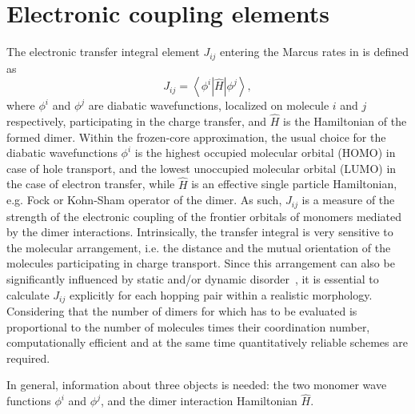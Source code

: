 \section{Electronic coupling elements}
\label{sec:transfer_integrals}

The electronic transfer integral element $J_{ij}$ entering the Marcus rates in  is defined as
\begin{equation}
   J_{ij} = \left\langle \phi^i \left\vert \hat{H} \right\vert \phi^j \right\rangle ,
\label{equ:TI}
\end{equation}
where $\phi^i$ and $\phi^j$ are diabatic wavefunctions, localized on molecule $i$ and $j$ respectively, participating in the charge transfer, and $\hat{H}$ is the Hamiltonian of the formed dimer. Within the frozen-core approximation, the usual choice for the diabatic wavefunctions $\phi^i$  is the highest occupied molecular orbital (HOMO) in case of hole transport, and the lowest unoccupied molecular orbital (LUMO) in the case of electron transfer, while $\hat{H}$ is an effective single particle Hamiltonian, e.g. Fock or Kohn-Sham operator of the dimer. As such, $J_{ij}$ is a measure of the strength of the electronic coupling of the frontier orbitals of monomers mediated by the dimer interactions. Intrinsically, the transfer integral is very sensitive to the molecular arrangement, i.e. the distance and the mutual orientation of the molecules participating in charge transport. Since this arrangement can also be significantly influenced by
static and/or dynamic disorder~\cite{hutchison_hopping_2005,kirkpatrick_columnar_2008,troisi_charge_2009,vehoff_charge_2010-1,vehoff_charge_2010-2},
it is essential to calculate $J_{ij}$ explicitly for each hopping pair within a realistic morphology. Considering that the number of dimers for which  has to be evaluated is proportional to the number of molecules times their coordination number, computationally efficient and at the same time quantitatively reliable schemes are required.

In general, information about three objects is needed: the two monomer wave functions $\phi^i$ and $\phi^j$, and the dimer interaction Hamiltonian $\hat{H}$.  



